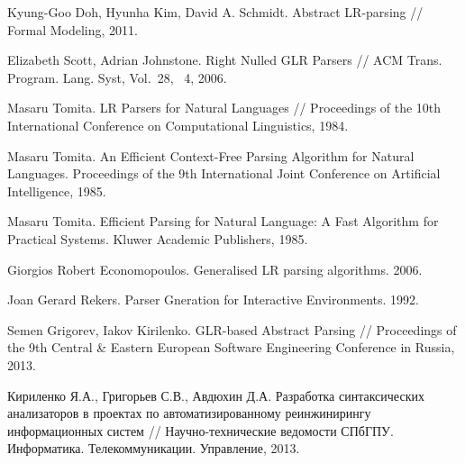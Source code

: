\begin{thebibliography}{99}
 Kyung-Goo Doh, Hyunha Kim, David A. Schmidt.
 Abstract LR-parsing // Formal Modeling, 2011.

 Elizabeth Scott, Adrian Johnstone.
 Right Nulled GLR Parsers //
 ACM Trans. Program. Lang. Syst, Vol.~28, \No~4, 2006.

 Masaru Tomita.
 LR Parsers for Natural Languages //
 Proceedings of the 10th International Conference on Computational Linguistics, 1984.

 Masaru Tomita.
 An Efficient Context-Free Parsing Algorithm for Natural Languages.
 Proceedings of the 9th International Joint Conference on Artificial Intelligence, 1985.

 Masaru Tomita.
 Efficient Parsing for Natural Language: A Fast Algorithm for Practical Systems. 
 Kluwer Academic Publishers, 1985.

  Giorgios Robert Economopoulos. 
  Generalised LR parsing algorithms. 2006.

  Joan Gerard Rekers.
  Parser Gneration for Interactive Environments. 1992.

  Semen Grigorev, Iakov Kirilenko.
  GLR-based Abstract Parsing // 
  Proceedings of the 9th Central \& Eastern European Software Engineering Conference in Russia, 2013.

 Кириленко Я.А., Григорьев С.В., Авдюхин Д.А.
 Разработка синтаксических анализаторов в проектах по автоматизированному реинжинирингу информационных систем //
 Научно-технические ведомости СПбГПУ. Информатика. Телекоммуникации. Управление, 2013.
\end{thebibliography}
